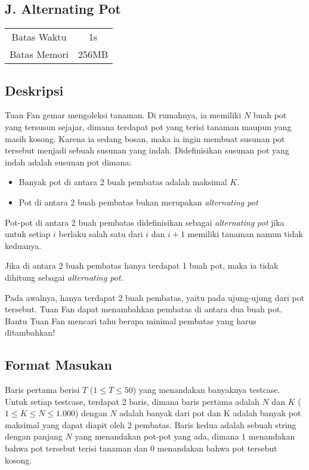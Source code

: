 \documentclass{article}
\begin{document}
\begin{center}
    \section*{J. Alternating Pot}

    \begin{tabular}{ | c c | }
        \hline
        Batas Waktu  & 1s \\  
        Batas Memori & 256MB \\
        \hline
    \end{tabular}
\end{center}

\subsection*{Deskripsi}

Tuan Fan gemar mengoleksi tanaman.
Di rumahnya, ia memiliki $N$ buah pot yang tersusun sejajar, dimana terdapat pot yang terisi tanaman maupun yang masih kosong.
Karena ia sedang bosan, maka ia ingin membuat susunan pot tersebut menjadi sebuah susunan yang indah.
Didefinisikan susunan pot yang indah adalah susunan pot dimana:

\begin{itemize}
    \setlength\itemsep{0pt}
    \item Banyak pot di antara 2 buah pembatas adalah maksimal $K$.
    \item Pot di antara 2 buah pembatas bukan merupakan \textit{alternating pot}
\end{itemize}

Pot-pot di antara 2 buah pembatas didefinisikan sebagai \textit{alternating pot} jika untuk setiap $i$ berlaku salah satu dari $i$ dan $i+1$ memiliki tanaman namun tidak keduanya.

Jika di antara 2 buah pembatas hanya terdapat 1 buah pot, maka ia tidak dihitung sebagai \textit{alternating pot}.

Pada awalnya, hanya terdapat 2 buah pembatas, yaitu pada ujung-ujung dari pot tersebut.
Tuan Fan dapat menambahkan pembatas di antara dua buah pot.
Bantu Tuan Fan mencari tahu berapa minimal pembatas yang harus ditambahkan!

\subsection*{Format Masukan}

Baris pertama berisi $T$ ($1 \leq T \leq 50$) yang menandakan banyaknya testcase.
Untuk setiap testcase, terdapat 2 baris, dimana baris pertama adalah $N$ dan $K$ ($1 \leq K \leq N \leq 1.000$) dengan $N$ adalah banyak dari pot dan K adalah banyak pot maksimal yang dapat diapit oleh 2 pembatas.
Baris kedua adalah sebuah string dengan panjang $N$ yang menandakan pot-pot yang ada, dimana $1$ menandakan bahwa pot tersebut terisi tanaman dan $0$ menandakan bahwa pot tersebut kosong.
\end{document}
